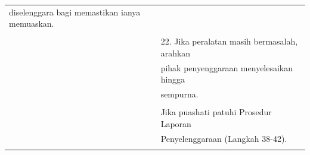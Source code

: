\documentclass[
]{article}
\begin{document}
\begin{longtable}[]{@{}ll@{}}
\begin{minipage}[t]{0.71\columnwidth}
diselenggara bagi memastikan ianya memuaskan.\strut
\end{minipage}\tabularnewline
\begin{minipage}[t]{0.23\columnwidth}\raggedright
\strut
\end{minipage} & \begin{minipage}[t]{0.71\columnwidth}\raggedright
\strut
\end{minipage}\tabularnewline
\begin{minipage}[t]{0.23\columnwidth}\raggedright
\strut
\end{minipage} & \begin{minipage}[t]{0.71\columnwidth}\raggedright
22. Jika peralatan masih bermasalah, arahkan\strut
\end{minipage}\tabularnewline
\begin{minipage}[t]{0.23\columnwidth}\raggedright
\strut
\end{minipage} & \begin{minipage}[t]{0.71\columnwidth}\raggedright
pihak penyenggaraan menyelesaikan hingga\strut
\end{minipage}\tabularnewline
\begin{minipage}[t]{0.23\columnwidth}\raggedright
\strut
\end{minipage} & \begin{minipage}[t]{0.71\columnwidth}\raggedright
sempurna.\strut
\end{minipage}\tabularnewline
\begin{minipage}[t]{0.23\columnwidth}\raggedright
\strut
\end{minipage} & \begin{minipage}[t]{0.71\columnwidth}\raggedright
\strut
\end{minipage}\tabularnewline
\begin{minipage}[t]{0.23\columnwidth}\raggedright
\strut
\end{minipage} & \begin{minipage}[t]{0.71\columnwidth}\raggedright
Jika puashati patuhi Prosedur Laporan\strut
\end{minipage}\tabularnewline
\begin{minipage}[t]{0.23\columnwidth}\raggedright
\strut
\end{minipage} & \begin{minipage}[t]{0.71\columnwidth}\raggedright
Penyelenggaraan (Langkah 38-42).\strut
\end{minipage}\tabularnewline
\begin{minipage}[t]{0.23\columnwidth}\raggedright

\end{minipage}
\end{longtable}
\end{document}
